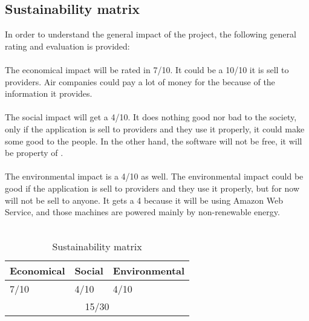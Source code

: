 \subsection{Sustainability matrix}

In order to understand the general impact of the project, the following general rating and evaluation is provided:
\\\\
The economical impact will be rated in 7/10. It could be a 10/10 it is sell to providers. Air companies could pay a lot of money for the \thesis because of the information it provides.
\\\\
The social impact will get a 4/10. It does nothing good nor bad to the society, only if the application is sell to providers and they use it properly, it could make some good to the people. In the other hand, the software will not be free, it will be property of \company.
\\\\
The environmental impact is a 4/10 as well. The environmental impact could be good if the application is sell to providers and they use it properly, but for now will not be sell to anyone. It gets a 4 because it will be using Amazon Web Service, and those machines are powered mainly by non-renewable energy\cite{click_clean}.
\\\\

\begin{table}[H]
\centering
\begin{tabular}{|l|l|l|}
\hline
Economical & Social & Environmental \\ \hline
7/10       & 4/10   & 4/10          \\ \hline
\multicolumn{3}{|c|}{15/30}         \\ \hline
\end{tabular}
\caption{Sustainability matrix}
\label{sustainability-matrix}
\end{table}

